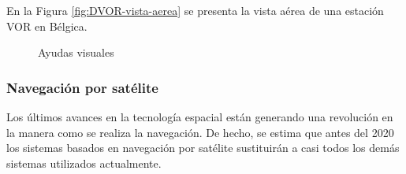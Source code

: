 En la Figura \ref{fig:DVOR-vista-aerea} se presenta la vista a\'erea de una estaci\'on VOR en B\'elgica. 



\begin{figure}[!h]
  \centering


\caption{Ayudas visuales}
\end{figure}




\subsubsection{Navegaci\'on por sat\'elite}

Los \'ultimos avances en la tecnolog\'ia espacial est\'an generando una revoluci\'on en la manera como se realiza la navegaci\'on. De hecho, se estima que antes del 2020 los sistemas basados en navegaci\'on por sat\'elite sustituir\'an a casi todos los dem\'as sistemas utilizados actualmente.


